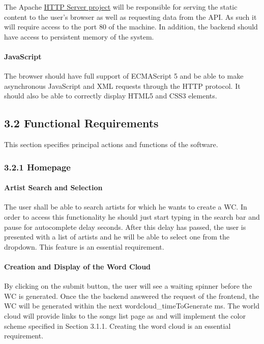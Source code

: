 \documentclass[]{article}
\begin{document}
The Apache \href{http://httpd.apache.org/}{HTTP Server project} will be
responsible for serving the static content to the user's browser as well
as requesting data from the API. As such it will require access to the
port 80 of the machine. In addition, the backend should have access to
persistent memory of the system.

\paragraph{JavaScript}\label{javascript}

The browser should have full support of ECMAScript 5 and be able to make
asynchronous JavaScript and XML requests through the HTTP protocol. It
should also be able to correctly display HTML5 and CSS3 elements.

\subsection{3.2 Functional Requirements}\label{functional-requirements}

This section specifies principal actions and functions of the software.

\subsubsection{3.2.1 Homepage}\label{homepage}

\paragraph{Artist Search and
Selection}\label{artist-search-and-selection}

The user shall be able to search artists for which he wants to create a
WC. In order to access this functionality he should just start typing in
the search bar and pause for autocomplete delay seconds. After this
delay has passed, the user is presented with a list of artists and he
will be able to select one from the dropdown. This feature is an
essential requirement.

\paragraph{Creation and Display of the Word
Cloud}\label{creation-and-display-of-the-word-cloud}

By clicking on the submit button, the user will see a waiting spinner
before the WC is generated. Once the the backend answered the request of
the frontend, the WC will be generated within the next
wordcloud\_timeToGenerate ms. The world cloud will provide links to the
songs list page as and will implement the color scheme specified in
Section 3.1.1. Creating the word cloud is an essential requirement.
\end{document}
